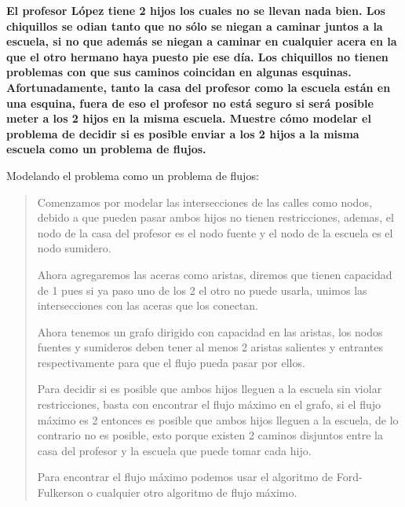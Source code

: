 \textbf{
    El profesor López tiene 2 hijos los cuales no se llevan nada bien. Los chiquillos se 
    odian tanto que no sólo se niegan a caminar juntos a la escuela, si no que además se 
    niegan a caminar en cualquier acera en la que el otro hermano haya puesto pie ese día.
    Los chiquillos no tienen problemas con que sus caminos coincidan en algunas esquinas.
    Afortunadamente, tanto la casa del profesor como la escuela están en una esquina, fuera
    de eso el profesor no está seguro si será posible meter a los 2 hijos en la misma escuela.
    Muestre cómo modelar el problema de decidir si es posible enviar a los 2 hijos a la misma 
    escuela como un problema de flujos.
}\vspace{.2cm}

\textcolor{bibi}{Modelando el problema como un problema de flujos:}
\begin{quote}
    Comenzamos por modelar las intersecciones de las calles como nodos, debido a que pueden pasar ambos hijos no tienen restricciones, ademas, el nodo de la casa del profesor es el nodo fuente y el nodo de la escuela es el nodo sumidero. \vspace{.2cm}

    Ahora agregaremos las aceras como aristas, diremos que tienen capacidad de 1 pues si ya paso uno de los 2 el otro no puede usarla, unimos las intersecciones con las aceras que los conectan. \vspace{.2cm}

    Ahora tenemos un grafo dirigido con capacidad en las aristas, los nodos fuentes y sumideros deben tener al menos 2 aristas salientes y entrantes respectivamente para que el flujo pueda pasar por ellos. \vspace{.2cm}
    
    Para decidir si es posible que ambos hijos lleguen a la escuela sin violar restricciones, basta con encontrar el flujo máximo en el grafo, si el flujo máximo es 2 entonces es posible que ambos hijos lleguen a la escuela, de lo contrario no es posible, esto porque existen 2 caminos disjuntos entre la casa del profesor y la escuela que puede tomar cada hijo.\vspace{.2cm}

    Para encontrar el flujo máximo podemos usar el algoritmo de Ford-Fulkerson o cualquier otro algoritmo de flujo máximo. \vspace{.2cm}
\end{quote}